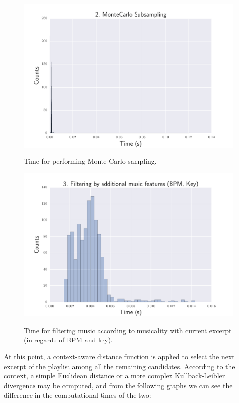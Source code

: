 \begin{figure}[htbp]
\begin{center}
\includegraphics[scale=0.7]{Figures/bench_subsampling.pdf}
  \caption[Time for performing Monte Carlo sampling]{Time for performing Monte Carlo sampling.}
  \label{fig:step2}
\vspace{2cm}
\includegraphics[scale=0.7]{Figures/bench_bpm_filters.pdf}
  \caption[Time for filtering music according to musicality with current excerpt]{Time for filtering music according to musicality with current excerpt (in regards of BPM and key).}
  \label{fig:step3}
\end{center}
\end{figure}

At this point, a context-aware distance function is applied to select the next excerpt of the playlist among all the remaining candidates. According to the context, a simple Euclidean distance or a more complex Kullback-Leibler divergence may be computed, and from the following graphs we can see the difference in the computational times of the two:


